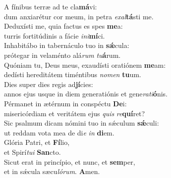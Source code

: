 \evenverse A fínibus terræ ad te cla\textbf{má}vi:~\*\\
\evenverse dum anxiarétur cor meum, in petra \textit{e}\textit{xal}\textbf{tá}sti me.\\
\oddverse Deduxísti me, quia factus es spes \textbf{me}a:~\*\\
\oddverse turris fortitúdinis a fácie \textit{i}\textit{ni}\textbf{mí}ci.\\
\evenverse Inhabitábo in tabernáculo tuo in \textbf{sǽ}cula:~\*\\
\evenverse prótegar in velaménto alá\textit{rum} \textit{tu}\textbf{á}rum.\\
\oddverse Quóniam tu, Deus meus, exaudísti oratiónem \textbf{me}am:~\*\\
\oddverse dedísti hereditátem timéntibus \textit{no}\textit{men} \textbf{tu}um.\\
\evenverse Dies super dies regis ad\textbf{jí}cies:~\*\\
\evenverse annos ejus usque in diem generatiónis et gene\textit{ra}\textit{ti}\textbf{ó}nis.\\
\oddverse Pérmanet in ætérnum in conspéctu \textbf{De}i:~\*\\
\oddverse misericórdiam et veritátem ejus \textit{quis} \textit{re}\textbf{quí}ret?\\
\evenverse Sic psalmum dicam nómini tuo in sǽculum \textbf{sǽ}culi:~\*\\
\evenverse ut reddam vota mea de di\textit{e} \textit{in} \textbf{di}em.\\
\oddverse Glória Patri, et \textbf{Fí}lio,~\*\\
\oddverse et Spirí\textit{tu}\textit{i} \textbf{San}cto.\\
\evenverse Sicut erat in princípio, et nunc, et \textbf{sem}per,~\*\\
\evenverse et in sǽcula sæcu\textit{ló}\textit{rum}. \textbf{A}men.\\

